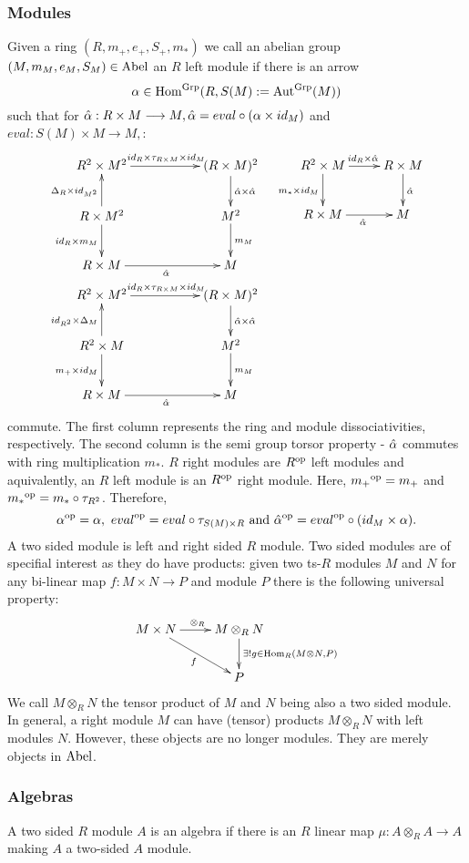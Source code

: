 \subsubsection{Modules} Given a ring $(R,m_+,e_+,S_+,m_*)$ we call an abelian group $(M,m_M,e_M,S_M) \in \rm{Abel}$ an $R$ left module if there is an arrow $$\alpha \in \mathrm{Hom}^{\rm{Grp}}(R,S(M) := \mathrm{Aut}^{\rm{Grp}}(M))$$ such that for $\hat{\alpha} : R \times M \longrightarrow M, \hat{\alpha} = eval \circ (\alpha \times id_M)$ and $eval: S(M) \times M \longrightarrow M,$:
$$\bao{cc}
 \xymatrix{
R^2 \times M^2\ar[rr]^{id_R \times \tau_{R \times M} \times id_M}&&(R \times M)^2\ar[d]^{\htalpha \times \htalpha}\\
R \times M^2\ar[d]_{id_R \times m_M}\ar[u]^{\Delta_R \times id_{M^2}}&&M^2\ar[d]^{m_M}\\
R \times M \ar[rr]_{\htalpha}&&M\\
}
& \xymatrix{
R^2 \times M \ar[d]_{m_* \times id_M}\ar[r]^{id_R \times \htalpha}&R \times M\ar[d]^\htalpha\\
R \times M \ar[r]_\htalpha &M\\
}
\\ \xymatrix{
R^2 \times M^2\ar[rr]^{id_R \times \tau_{R \times M} \times id_M}&&(R \times M)^2\ar[d]^{\htalpha \times \htalpha}\\
R^2 \times M\ar[d]_{m_+ \times id_M}\ar[u]^{id_{R^2} \times \Delta_M}&&M^2\ar[d]^{m_M}\\
R \times M \ar[rr]_{\htalpha}&&M\\
}
\ea$$
commute. The first column represents the ring and module dissociativities, respectively. The second column is the semi group torsor property - $\hat{\alpha}$ commutes with ring multiplication $m_*$. $R$ right modules are ${R}^{\rm{op}}$ left modules and aquivalently, an $R$ left module is an ${R}^{\rm{op}}$ right module. Here, ${m_+}^{\rm{op}} = m_+$ and ${m_*}^{\rm{op}} = m_* \circ \tau_{R^2}$. Therefore,
$${\alpha}^{\rm{op}} = \alpha,\ {eval}^{\rm{op}} = eval \circ \tau_{S(M) \times R} \ \mathrm{and}\ {\hat{\alpha}}^{\rm{op}} = {eval}^{\rm{op}} \circ (id_M \times \alpha).$$
A two sided module is left and right sided $R$ module. Two sided modules are of specifial interest as they do have products: given two ts-$R$ modules $M$ and $N$ for any bi-linear map $f : M \times N \longrightarrow P$ and module $P$ there is the following universal property:
$$\xymatrix{
M \times N \ar[r]^{\otimes_R}\ar[rd]_{f}&M \otimes_R N\ar[d]^{\exists! g \in \mrm{Hom}_R(M\otimes N,P)}\\
&P\\
}$$
We call $M \otimes_R N$ the tensor product of $M$ and $N$ being also a two sided module. In general, a right module $M$ can have (tensor) products $M \otimes_R N$ with left modules $N$. However, these objects are no longer modules. They are merely objects in $\rm{Abel}$. 
\subsubsection{Algebras} A two sided $R$ module $A$ is an algebra if there is an $R$ linear map $\mu : A \otimes_R A \longrightarrow A$ making $A$ a two-sided $A$ module.



